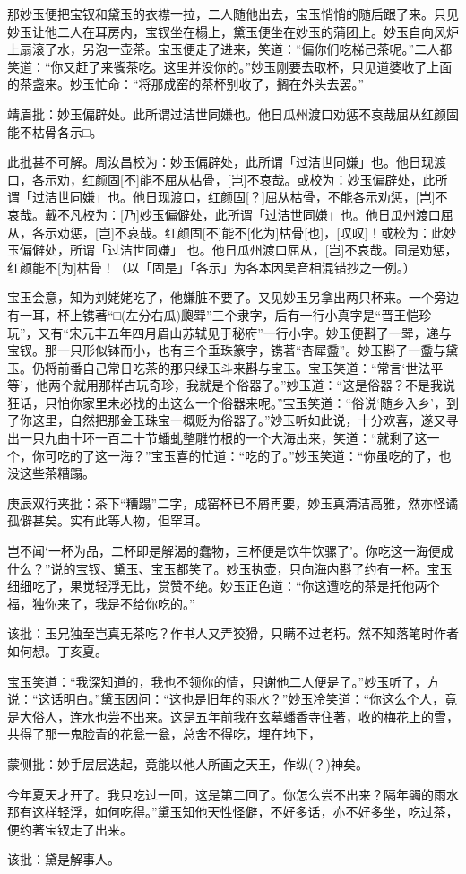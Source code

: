 \begin{parag}


    那妙玉便把宝钗和黛玉的衣襟一拉，二人随他出去，宝玉悄悄的随后跟了来。只见妙玉让他二人在耳房内，宝钗坐在榻上，黛玉便坐在妙玉的蒲团上。妙玉自向风炉上扇滚了水，另泡一壶茶。宝玉便走了进来，笑道：“偏你们吃梯己茶呢。”二人都笑道：“你又赶了来飺茶吃。这里并没你的。”妙玉刚要去取杯，只见道婆收了上面的茶盏来。妙玉忙命：“将那成窑的茶杯别收了，搁在外头去罢。”\begin{note}靖眉批：妙玉偏辟处。此所谓过洁世同嫌也。他日瓜州渡口劝惩不哀哉屈从红颜固能不枯骨各示□。\end{note}\begin{subnote}此批甚不可解。周汝昌校为：妙玉偏辟处，此所谓「过洁世同嫌」也。他日现渡口，各示劝，红颜固[不]能不屈从枯骨，[岂]不哀哉。或校为：妙玉偏辟处，此所谓「过洁世同嫌」也。他日现渡口，红颜固[？]屈从枯骨，不能各示劝惩，[岂]不哀哉。戴不凡校为：[乃]妙玉偏僻处，此所谓「过洁世同嫌」也。他日瓜州渡口屈从，各示劝惩，[岂]不哀哉。红颜固[不]能不[化为]枯骨[也]，[叹叹]！或校为：此妙玉偏僻处，所谓「过洁世同嫌」 也。他日瓜州渡口屈从，[岂]不哀哉。固是劝惩，红颜能不[为]枯骨！（以「固是」「各示」为各本因吴音相混错抄之一例。）\end{subnote}宝玉会意，知为刘姥姥吃了，他嫌脏不要了。又见妙玉另拿出两只杯来。一个旁边有一耳，杯上镌著“□(左分右瓜)瓟斝”三个隶字，后有一行小真字是“晋王恺珍玩”，又有“宋元丰五年四月眉山苏轼见于秘府”一行小字。妙玉便斟了一斝，递与宝钗。那一只形似钵而小，也有三个垂珠篆字，镌著“杏犀䀉”。妙玉斟了一䀉与黛玉。仍将前番自己常日吃茶的那只绿玉斗来斟与宝玉。宝玉笑道：“常言‘世法平等’，他两个就用那样古玩奇珍，我就是个俗器了。”妙玉道：“这是俗器？不是我说狂话，只怕你家里未必找的出这么一个俗器来呢。”宝玉笑道：“俗说‘随乡入乡’，到了你这里，自然把那金玉珠宝一概贬为俗器了。”妙玉听如此说，十分欢喜，遂又寻出一只九曲十环一百二十节蟠虬整雕竹根的一个大海出来，笑道：“就剩了这一个，你可吃的了这一海？”宝玉喜的忙道：“吃的了。”妙玉笑道：“你虽吃的了，也没这些茶糟蹋。\begin{note}庚辰双行夹批：茶下“糟蹋”二字，成窑杯已不屑再要，妙玉真清洁高雅，然亦怪谲孤僻甚矣。实有此等人物，但罕耳。\end{note}岂不闻‘一杯为品，二杯即是解渴的蠢物，三杯便是饮牛饮骡了’。你吃这一海便成什么？”说的宝钗、黛玉、宝玉都笑了。妙玉执壶，只向海内斟了约有一杯。宝玉细细吃了，果觉轻浮无比，赏赞不绝。妙玉正色道：“你这遭吃的茶是托他两个福，独你来了，我是不给你吃的。”\begin{note}该批：玉兄独至岂真无茶吃？作书人又弄狡猾，只瞒不过老朽。然不知落笔时作者如何想。丁亥夏。\end{note}宝玉笑道：“我深知道的，我也不领你的情，只谢他二人便是了。”妙玉听了，方说：“这话明白。”黛玉因问：“这也是旧年的雨水？”妙玉冷笑道：“你这么个人，竟是大俗人，连水也尝不出来。这是五年前我在玄墓蟠香寺住著，收的梅花上的雪，共得了那一鬼脸青的花瓮一瓮，总舍不得吃，埋在地下，\begin{note}蒙侧批：妙手层层迭起，竟能以他人所画之天王，作纵(？)神矣。\end{note}今年夏天才开了。我只吃过一回，这是第二回了。你怎么尝不出来？隔年蠲的雨水那有这样轻浮，如何吃得。”黛玉知他天性怪僻，不好多话，亦不好多坐，吃过茶，便约著宝钗走了出来。\begin{note}该批：黛是解事人。\end{note}

\end{parag}
